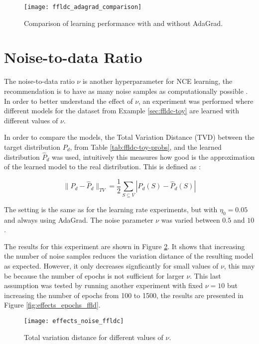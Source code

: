 \begin{figure}
  \centering
  \texttt{[image: ffldc\_adagrad\_comparison]}
  \caption{Comparison of learning performance with and without AdaGrad.}
  \label{fig:comparison_adagrad_ffldc_toy}
\end{figure}

\section{Noise-to-data Ratio}

The noise-to-data ratio $\nu$ is another hyperparameter for NCE learning, the recommendation is to have as many noise samples as computationally possible \citep{Gutmann12NCE}. In order to better understand the effect of $\nu$, an experiment was performed where different models for the dataset from Example \ref{sec:ffldc-toy} are learned with different values of $\nu$.

In order to compare the models, the Total Variation Distance (TVD) between the target distribution $P_{d}$, from Table \ref{tab:ffldc-toy-probs}, and the learned distribution $\hat{P}_{d}$ was used, intuitively this measures how good is the approximation of the learned model to the real distribution. This is defined as \citep[chap. 4]{levin2009markov}:

\begin{equation}
  \label{eq:total_var}
  \|P_{d} - \hat{P}_{d}\|_{TV}= \frac{1}{2}\sum_{S \subseteq V}|P_{d}(S) - \hat{P}_{d}(S)|
\end{equation}

The setting is the same as for the learning rate experiments, but with $\eta_{0} = 0.05$ and always using AdaGrad. The noise parameter $\nu$ was varied between $0.5$ and $10$.

The results for this experiment are shown in Figure \ref{fig:effects_noise_ffldc}. It shows that increasing the number of noise samples reduces the variation distance of the resulting model as expected. However, it only decreases signficantly for small values of $\nu$, this may be because the number of epochs is not sufficient for larger $\nu$. This last assumption was tested by running another experiment with fixed $\nu = 10$ but increasing the number of epochs from 100 to 1500, the results are presented in Figure \ref{fig:effects_epochs_ffld}.

\begin{figure}
  \centering
  \texttt{[image: effects\_noise\_ffldc]}
  \caption{Total variation distance for different values of $\nu$.}
  \label{fig:effects_noise_ffldc}
\end{figure}

